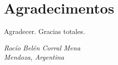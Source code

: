 \chapter*{Agradecimentos}

Agradecer. Gracias totales.







\begin{flushright}
  \textit{Rocío Belén Corral Mena} \\
  \textit{Mendoza, Argentina} \\
  \textit{\DTMMonthname{\month} \number\year}
\end{flushright}

